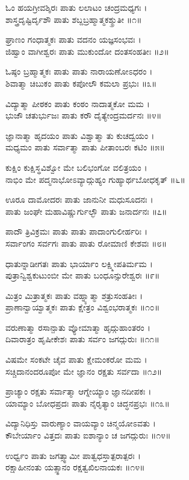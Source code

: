 ಓಂ ಹಯಗ್ರೀವಶ್ಶಿರಃ ಪಾತು ಲಲಾಟಂ ಚಂದ್ರಮಧ್ಯಗಃ ।\\
ಶಾಸ್ತ್ರದೃಷ್ಟಿರ್ದೃಶೌ ಪಾತು ಶಬ್ದಬ್ರಹ್ಮಾತ್ಮಕಶ್ಶ್ರುತೀ ॥೧॥

ಘ್ರಾಣಂ ಗಂಧಾತ್ಮಕಃ ಪಾತು ವದನಂ ಯಜ್ಞಸಂಭವಃ ।\\
ಜಿಹ್ವಾಂ ವಾಗೀಶ್ವರಃ ಪಾತು ಮುಕುಂದೋ ದಂತಸಂಹತೀಃ ॥೨॥

ಓಷ್ಠಂ ಬ್ರಹ್ಮಾತ್ಮಕಃ ಪಾತು ಪಾತು ನಾರಾಯಣೋಽಧರಂ ।\\
ಶಿವಾತ್ಮಾ ಚಿಬುಕಂ ಪಾತು ಕಪೋಲೌ ಕಮಲಾ ಪ್ರಭುಃ ॥೩॥

ವಿದ್ಯಾತ್ಮಾ ಪೀಠಕಂ ಪಾತು ಕಂಠಂ ನಾದಾತ್ಮಕೋ ಮಮ ।\\
ಭುಜೌ ಚತುರ್ಭುಜಃ ಪಾತು ಕರೌ ದೈತ್ಯೇಂದ್ರಮರ್ದನಃ ॥೪॥

ಜ್ಞಾನಾತ್ಮಾ ಹೃದಯಂ ಪಾತು ವಿಶ್ವಾತ್ಮಾ ತು ಕುಚದ್ವಯಂ ।\\
ಮಧ್ಯಮಂ ಪಾತು ಸರ್ವಾತ್ಮಾ ಪಾತು ಪೀತಾಂಬರಃ ಕಟಿಂ ॥೫॥

ಕುಕ್ಷಿಂ ಕುಕ್ಷಿಸ್ಥವಿಶ್ವೋ ಮೇ ಬಲಿಭಂಗೋ ವಲಿತ್ರಯಂ ।\\
ನಾಭಿಂ ಮೇ ಪದ್ಮನಾಭೋಽವ್ಯಾದ್ಗುಹ್ಯಂ ಗುಹ್ಯಾರ್ಥಬೋಧಕೃತ್ ॥೬॥

ಊರೂ ದಾಮೋದರಃ ಪಾತು ಜಾನುನೀ ಮಧುಸೂದನಃ ।\\
ಪಾತು ಜಂಘೇ ಮಹಾವಿಷ್ಣುರ್ಗುಲ್ಭೌ ಪಾತು ಜನಾರ್ದನಃ ॥೭॥

ಪಾದೌ ತ್ರಿವಿಕ್ರಮಃ ಪಾತು ಪಾತು ಪಾದಾಂಗುಲೀರ್ಹರಿಃ ।\\
ಸರ್ವಾಂಗಂ ಸರ್ವಗಃ ಪಾತು ಪಾತು ರೋಮಾಣಿ ಕೇಶವಃ ॥೮॥

ಧಾತುನ್ನಾಡೀಗತಃ ಪಾತು ಭಾರ್ಯಾಂ ಲಕ್ಷ್ಮೀಪತಿರ್ಮಮ ।\\
ಪುತ್ರಾನ್ವಿಶ್ವಕುಟುಂಬೀ ಮೇ ಪಾತು ಬಂಧೂನ್ಸುರೇಶ್ವರಃ ॥೯॥

ಮಿತ್ರಂ ಮಿತ್ರಾತ್ಮಕಃ ಪಾತು ವಹ್ನ್ಯಾತ್ಮಾ ಶತ್ರುಸಂಹತೀಃ ।\\
ಪ್ರಾಣಾನ್ವಾಯ್ವಾತ್ಮಕಃ ಪಾತು ಕ್ಷೇತ್ರಂ ವಿಶ್ವಂಭರಾತ್ಮಕಃ ॥೧೦॥

ವರುಣಾತ್ಮಾ ರಸಾನ್ಪಾತು ವ್ಯೋಮಾತ್ಮಾ ಹೃದ್ಗುಹಾಂತರಂ ।\\
ದಿವಾರಾತ್ರಂ ಹೃಷೀಕೇಶಃ ಪಾತು ಸರ್ವಂ ಜಗದ್ಗುರುಃ ॥೧೧॥

ವಿಷಮೇ ಸಂಕಟೇ ಚೈವ ಪಾತು ಕ್ಷೇಮಂಕರೋ ಮಮ ।\\
ಸಚ್ಚಿದಾನಂದರೂಪೋ ಮೇ ಜ್ಞಾನಂ ರಕ್ಷತು ಸರ್ವದಾ ॥೧೨॥

ಪ್ರಾಚ್ಯಾಂ ರಕ್ಷತು ಸರ್ವಾತ್ಮಾ ಆಗ್ನೇಯ್ಯಾಂ ಜ್ಞಾನದೀಪಕಃ ।\\
ಯಾಮ್ಯಾಂ ಬೋಧಪ್ರದಃ ಪಾತು ನೈರೃತ್ಯಾಂ ಚಿದ್ಧನಪ್ರಭಃ ॥೧೩॥

ವಿದ್ಯಾನಿಧಿಸ್ತು ವಾರುಣ್ಯಾಂ ವಾಯವ್ಯಾಂ ಚಿನ್ಮಯೋಽವತು ।\\
ಕೌಬೇರ್ಯಾಂ ವಿತ್ತದಃ ಪಾತು ಐಶಾನ್ಯಾಂ ಚ ಜಗದ್ಗುರುಃ ॥೧೪॥

ಉರ್ಧ್ವಂ ಪಾತು ಜಗತ್ಸ್ವಾಮೀ ಪಾತ್ವಧಸ್ತಾತ್ಪರಾತ್ಪರಃ ।\\
ರಕ್ಷಾಹೀನಂತು ಯತ್ಸ್ಥಾನಂ ರಕ್ಷತ್ವಖಿಲನಾಯಕಃ ॥೧೪॥

